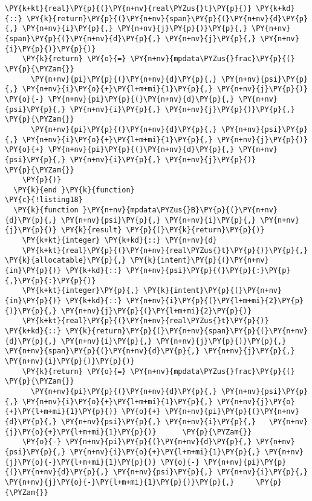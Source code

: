 \begin{Verbatim}[commandchars=\\\{\}]
    \PY{k+kt}{real}\PY{p}{(}\PY{n+nv}{real\PYZus{}t}\PY{p}{)} \PY{k+kd}{::} \PY{k}{return}\PY{p}{(}\PY{n+nv}{span}\PY{p}{(}\PY{n+nv}{d}\PY{p}{,} \PY{n+nv}{i}\PY{p}{,} \PY{n+nv}{j}\PY{p}{)}\PY{p}{,} \PY{n+nv}{span}\PY{p}{(}\PY{n+nv}{d}\PY{p}{,} \PY{n+nv}{j}\PY{p}{,} \PY{n+nv}{i}\PY{p}{)}\PY{p}{)}
    \PY{k}{return} \PY{o}{=} \PY{n+nv}{mpdata\PYZus{}frac}\PY{p}{(}                              \PY{p}{\PYZam{}}
      \PY{n+nv}{pi}\PY{p}{(}\PY{n+nv}{d}\PY{p}{,} \PY{n+nv}{psi}\PY{p}{,} \PY{n+nv}{i}\PY{o}{+}\PY{l+m+mi}{1}\PY{p}{,} \PY{n+nv}{j}\PY{p}{)} \PY{o}{-} \PY{n+nv}{pi}\PY{p}{(}\PY{n+nv}{d}\PY{p}{,} \PY{n+nv}{psi}\PY{p}{,} \PY{n+nv}{i}\PY{p}{,} \PY{n+nv}{j}\PY{p}{)}\PY{p}{,}           \PY{p}{\PYZam{}}
      \PY{n+nv}{pi}\PY{p}{(}\PY{n+nv}{d}\PY{p}{,} \PY{n+nv}{psi}\PY{p}{,} \PY{n+nv}{i}\PY{o}{+}\PY{l+m+mi}{1}\PY{p}{,} \PY{n+nv}{j}\PY{p}{)} \PY{o}{+} \PY{n+nv}{pi}\PY{p}{(}\PY{n+nv}{d}\PY{p}{,} \PY{n+nv}{psi}\PY{p}{,} \PY{n+nv}{i}\PY{p}{,} \PY{n+nv}{j}\PY{p}{)}            \PY{p}{\PYZam{}}
    \PY{p}{)}  
  \PY{k}{end }\PY{k}{function}
\PY{c}{!listing18}
  \PY{k}{function }\PY{n+nv}{mpdata\PYZus{}B}\PY{p}{(}\PY{n+nv}{d}\PY{p}{,} \PY{n+nv}{psi}\PY{p}{,} \PY{n+nv}{i}\PY{p}{,} \PY{n+nv}{j}\PY{p}{)} \PY{k}{result} \PY{p}{(}\PY{k}{return}\PY{p}{)}
    \PY{k+kt}{integer} \PY{k+kd}{::} \PY{n+nv}{d}
    \PY{k+kt}{real}\PY{p}{(}\PY{n+nv}{real\PYZus{}t}\PY{p}{)}\PY{p}{,} \PY{k}{allocatable}\PY{p}{,} \PY{k}{intent}\PY{p}{(}\PY{n+nv}{in}\PY{p}{)} \PY{k+kd}{::} \PY{n+nv}{psi}\PY{p}{(}\PY{p}{:}\PY{p}{,}\PY{p}{:}\PY{p}{)} 
    \PY{k+kt}{integer}\PY{p}{,} \PY{k}{intent}\PY{p}{(}\PY{n+nv}{in}\PY{p}{)} \PY{k+kd}{::} \PY{n+nv}{i}\PY{p}{(}\PY{l+m+mi}{2}\PY{p}{)}\PY{p}{,} \PY{n+nv}{j}\PY{p}{(}\PY{l+m+mi}{2}\PY{p}{)}
    \PY{k+kt}{real}\PY{p}{(}\PY{n+nv}{real\PYZus{}t}\PY{p}{)} \PY{k+kd}{::} \PY{k}{return}\PY{p}{(}\PY{n+nv}{span}\PY{p}{(}\PY{n+nv}{d}\PY{p}{,} \PY{n+nv}{i}\PY{p}{,} \PY{n+nv}{j}\PY{p}{)}\PY{p}{,} \PY{n+nv}{span}\PY{p}{(}\PY{n+nv}{d}\PY{p}{,} \PY{n+nv}{j}\PY{p}{,} \PY{n+nv}{i}\PY{p}{)}\PY{p}{)}
    \PY{k}{return} \PY{o}{=} \PY{n+nv}{mpdata\PYZus{}frac}\PY{p}{(}                              \PY{p}{\PYZam{}}
      \PY{n+nv}{pi}\PY{p}{(}\PY{n+nv}{d}\PY{p}{,} \PY{n+nv}{psi}\PY{p}{,} \PY{n+nv}{i}\PY{o}{+}\PY{l+m+mi}{1}\PY{p}{,} \PY{n+nv}{j}\PY{o}{+}\PY{l+m+mi}{1}\PY{p}{)} \PY{o}{+} \PY{n+nv}{pi}\PY{p}{(}\PY{n+nv}{d}\PY{p}{,} \PY{n+nv}{psi}\PY{p}{,} \PY{n+nv}{i}\PY{p}{,}   \PY{n+nv}{j}\PY{o}{+}\PY{l+m+mi}{1}\PY{p}{)}      \PY{p}{\PYZam{}}
    \PY{o}{-} \PY{n+nv}{pi}\PY{p}{(}\PY{n+nv}{d}\PY{p}{,} \PY{n+nv}{psi}\PY{p}{,} \PY{n+nv}{i}\PY{o}{+}\PY{l+m+mi}{1}\PY{p}{,} \PY{n+nv}{j}\PY{o}{-}\PY{l+m+mi}{1}\PY{p}{)} \PY{o}{-} \PY{n+nv}{pi}\PY{p}{(}\PY{n+nv}{d}\PY{p}{,} \PY{n+nv}{psi}\PY{p}{,} \PY{n+nv}{i}\PY{p}{,}   \PY{n+nv}{j}\PY{o}{-}\PY{l+m+mi}{1}\PY{p}{)}\PY{p}{,}     \PY{p}{\PYZam{}}

\end{Verbatim}
